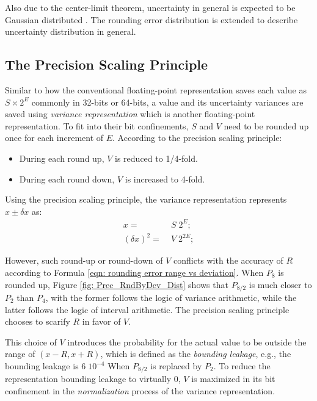 \documentclass[twoside]{article}
\numberwithin{equation}{section}
\begin{document}
Also due to the center-limit theorem, uncertainty in general is expected to be Gaussian distributed \cite{Statistical_Methods} \cite{Probability_Statistics}. 
The rounding error distribution is extended to describe uncertainty distribution in general.



\subsection{The Precision Scaling Principle}

Similar to how the conventional floating-point representation \cite{Floating_Point_Standard} saves each value as $S\times 2^E$ commonly in 32-bits or 64-bits, a value and its uncertainty variances are saved using \emph{variance representation} which is another floating-point representation.
To fit into their bit confinements, $S$ and $V$ need to be rounded up once for each increment of $E$.
According to the precision scaling principle:
\begin{itemize}
\item During each round up, $V$ is reduced to 1/4-fold. 

\item During each round down, $V$ is increased to 4-fold.
\end{itemize}
Using the precision scaling principle, the variance representation represents $x \pm \delta x$ as:
\begin{align}
\label{eqn: accurate value}
x =&\; S \; 2^{E};\\
\label{eqn: uncertainty variance}
(\delta x)^2 =&\; V \; 2^{2E};
\end{align}

However, such round-up or round-down of $V$ conflicts with the accuracy of $R$ according to Formula \eqref{eqn: rounding error range vs deviation}.
When $P_8$ is rounded up, Figure \ref{fig: Prec_RndByDev_Dist} shows that $P_{8/2}$ is much closer to $P_2$ than $P_4$, with the former follows the logic of variance arithmetic, while the latter follows the logic of interval arithmetic. 
The precision scaling principle chooses to scarify $R$ in favor of $V$.

This choice of $V$ introduces the probability for the actual value to be outside the range of $(x - R, x + R)$, which is defined as the \emph{bounding leakage}, e.g., the bounding leakage is $6\;10^{-4}$ When $P_{8/2}$ is replaced by $P_2$.
To reduce the representation bounding leakage to virtually 0, $V$ is maximized in its bit confinement in the \emph{normalization} process of the variance representation.
\end{document}
